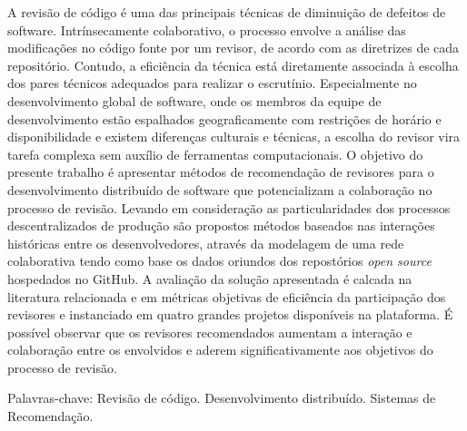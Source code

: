 \documentclass[12pt,openany,oneside,a4paper,english,brazil]{abntbibufjf}
\begin{document}


\setlength{\absparsep}{18pt}
\begin{resumo}
A revisão de código é uma das principais técnicas de diminuição de defeitos de software. Intrínsecamente colaborativo, o processo envolve a análise das modificações no código fonte por um revisor, de acordo com as diretrizes de cada repositório. Contudo, a eficiência da técnica está diretamente associada à escolha dos pares técnicos adequados para realizar o escrutínio. Especialmente no desenvolvimento global de software, onde os membros da equipe de desenvolvimento estão espalhados geograficamente com restrições de horário e disponibilidade e existem diferenças culturais e técnicas, a escolha do revisor vira tarefa complexa sem auxílio de ferramentas computacionais. O objetivo do presente trabalho é apresentar métodos de recomendação de revisores para o desenvolvimento distribuído de software que potencializam a colaboração no processo de revisão. Levando em consideração as particularidades dos processos descentralizados de produção são propostos métodos baseados nas interações históricas entre os desenvolvedores, através da modelagem de uma rede colaborativa tendo como base os dados oriundos dos repostórios \textit{open source} hospedados no GitHub. A avaliação da solução apresentada é calcada na literatura relacionada e em métricas objetivas de eficiência da participação dos revisores e instanciado em quatro grandes projetos disponíveis na plataforma. É possível observar que os revisores recomendados aumentam a interação e colaboração entre os envolvidos e aderem significativamente aos objetivos do processo de revisão.


Palavras-chave: Revisão de código. Desenvolvimento distribuído. Sistemas de Recomendação. %

\end{resumo}
\end{document}
